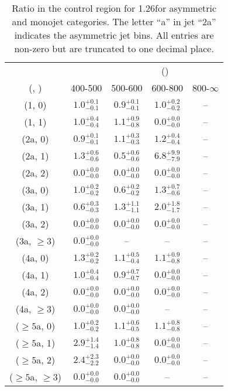 \begin{table}[h!]
\tiny
\centering
\caption{Ratio in the \gj control region for 1.26\ifb for asymmetric and monojet categories. The letter ``a'' in jet \eg ``2a''  indicates the asymmetric jet bins. All entries are non-zero but are truncated to one decimal place.\label{tab:ratiosep_ewk_gj_asym}}
\begin{tabular}
{ccccc}
	\hline\hline
&	& \multicolumn{4}{c}{\scalht (\gev)} \\ 
	 (\njet,  \nb) & 400-500 & 500-600 & 600-800 & 800-$\infty$ \\ [0.8ex] 
\hline
	(1, 0) & $1.0^{+ 0.1 }_{- 0.1 }$ & $0.9^{+ 0.1 }_{- 0.1 }$ & $1.0^{+ 0.2 }_{- 0.2 }$ & -- \\[0.5ex] 
	(1, 1) & $1.0^{+ 0.4 }_{- 0.4 }$ & $1.1^{+ 0.9 }_{- 0.8 }$ & $0.0^{+ 0.0 }_{- 0.0 }$ & -- \\[0.5ex] 
	(2a, 0) & $0.9^{+ 0.1 }_{- 0.1 }$ & $1.1^{+ 0.3 }_{- 0.3 }$ & $1.2^{+ 0.4 }_{- 0.4 }$ & -- \\[0.5ex] 
	(2a, 1) & $1.3^{+ 0.6 }_{- 0.6 }$ & $0.5^{+ 0.6 }_{- 0.6 }$ & $6.8^{+ 9.9 }_{- 7.9 }$ & -- \\[0.5ex] 
	(2a, 2) & $0.0^{+ 0.0 }_{- 0.0 }$ & $0.0^{+ 0.0 }_{- 0.0 }$ & $0.0^{+ 0.0 }_{- 0.0 }$ & -- \\[0.5ex] 
	(3a, 0) & $1.0^{+ 0.2 }_{- 0.2 }$ & $0.6^{+ 0.2 }_{- 0.2 }$ & $1.3^{+ 0.7 }_{- 0.6 }$ & -- \\[0.5ex] 
	(3a, 1) & $0.6^{+ 0.3 }_{- 0.3 }$ & $1.3^{+ 1.1 }_{- 1.1 }$ & $2.0^{+ 1.8 }_{- 1.7 }$ & -- \\[0.5ex] 
	(3a, 2) & $0.0^{+ 0.0 }_{- 0.0 }$ & $0.0^{+ 0.0 }_{- 0.0 }$ & $0.0^{+ 0.0 }_{- 0.0 }$ & -- \\[0.5ex] 
	(3a, $\ge3$) & $0.0^{+ 0.0 }_{- 0.0 }$ & -- & -- & -- \\[0.5ex] 
	(4a, 0) & $1.3^{+ 0.2 }_{- 0.2 }$ & $1.1^{+ 0.5 }_{- 0.4 }$ & $1.1^{+ 0.9 }_{- 0.8 }$ & -- \\[0.5ex] 
	(4a, 1) & $1.0^{+ 0.4 }_{- 0.4 }$ & $0.9^{+ 0.7 }_{- 0.7 }$ & $0.0^{+ 0.0 }_{- 0.0 }$ & -- \\[0.5ex] 
	(4a, 2) & $0.0^{+ 0.0 }_{- 0.0 }$ & $0.0^{+ 0.0 }_{- 0.0 }$ & $0.0^{+ 0.0 }_{- 0.0 }$ & -- \\[0.5ex] 
	(4a, $\ge3$) & $0.0^{+ 0.0 }_{- 0.0 }$ & $0.0^{+ 0.0 }_{- 0.0 }$ & -- & -- \\[0.5ex] 
	($\ge5$a, 0) & $1.0^{+ 0.2 }_{- 0.2 }$ & $1.1^{+ 0.6 }_{- 0.5 }$ & $1.1^{+ 0.8 }_{- 0.8 }$ & -- \\[0.5ex] 
	($\ge5$a, 1) & $2.9^{+ 1.4 }_{- 1.4 }$ & $1.0^{+ 0.8 }_{- 0.8 }$ & $0.0^{+ 0.0 }_{- 0.0 }$ & -- \\[0.5ex] 
	($\ge5$a, 2) & $2.4^{+ 2.3 }_{- 2.2 }$ & $0.0^{+ 0.0 }_{- 0.0 }$ & $0.0^{+ 0.0 }_{- 0.0 }$ & -- \\[0.5ex] 
	($\ge5$a, $\ge3$) & $0.0^{+ 0.0 }_{- 0.0 }$ & $0.0^{+ 0.0 }_{- 0.0 }$ & -- & -- \\[0.5ex] 
	\hline
	\hline
\end{tabular}
\end{table}

